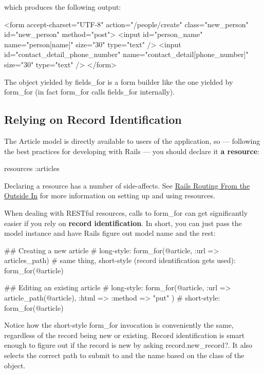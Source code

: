\documentclass[10pt]{book}
\newenvironment{code}{%
  \scriptsize
    \verbatim
}{%
    \endverbatim
    \newline
}
\begin{document}
which produces the following output:
\begin{code}
<form accept-charset="UTF-8" action="/people/create" 
    class="new_person" id="new_person" method="post">
  <input id="person_name" name="person[name]" size="30" type="text" />
  <input id="contact_detail_phone_number" 
      name="contact_detail[phone_number]" size="30" type="text" />
</form>
\end{code}

The object yielded by fields\_for is a form builder like the one yielded by form\_for (in fact form\_for calls fields\_for internally).

\subsection{ Relying on Record Identification}

The Article model is directly available to users of the application,  so — following the best practices for developing with Rails — you should  declare it \textbf{a resource}:
\begin{code}
resources :articles
\end{code}

Declaring a resource has a number of side-affects. See \href{http://guides.rubyonrails.org/routing.html#resource-routing-the-rails-default}{Rails Routing From the Outside In} for more information on setting up and using resources.

When dealing with RESTful resources, calls to form\_for can get significantly easier if you rely on \textbf{record identification}. In short, you can just pass the model instance and have Rails figure out model name and the rest:
\begin{code}
## Creating a new article
# long-style:
form_for(@article, :url => articles_path)
# same thing, short-style (record identification gets used):
form_for(@article)
 
## Editing an existing article
# long-style:
form_for(@article, :url => article_path(@article),
                   :html => { :method => "put" })
# short-style:
form_for(@article)
\end{code}

Notice how the short-style form\_for invocation is  conveniently the same, regardless of the record being new or existing.  Record identification is smart enough to figure out if the record is new  by asking record.new\_record?. It also selects the correct path to submit to and the name based on the class of the object.
\end{document}
